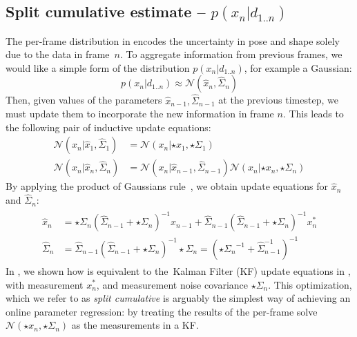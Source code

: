 \subsection{Split cumulative estimate -- $p(x_n|d_{1..n})$}
\label{sec:split}
The per-frame distribution in  encodes the uncertainty in pose and shape solely due to the data in frame~$n$.  To aggregate information from previous frames, we would like a simple form of the distribution $p(x_n|d_{1..n}) $, for example a Gaussian:
\begin{equation}
p(x_n|d_{1..n}) \approx \mathcal{N}(\hat{x}_n, \hat{\Sigma}_n)
\end{equation}
Then, given values of the parameters $\hat{x}_{n-1}, \hat{\Sigma}_{n-1}$ at the previous timestep, we must update them to incorporate the new information in frame $n$.   
%
This leads to the following pair of inductive update equations:
\begin{align}
\mathcal{N}(x_n|\hat{x}_1, \hat{\Sigma}_1) &= \mathcal{N}(x_n|\star{x}_1, \star{\Sigma}_1) \\
\mathcal{N}(x_n | \hat{x}_n, \hat{\Sigma}_n) &= \mathcal{N}(x_n | \hat{x}_{n-1}, \hat{\Sigma}_{n-1}) \mathcal{N}(x_n |\star{x}_n, \star{\Sigma}_n)
\end{align}
By applying the product of Gaussians rule~\cite{petersen2008matrix}, we obtain update equations for $\hat{x}_n$ and $\hat{\Sigma}_n$:
% 
\begin{align}
\begin{split}
\hat{x}_{n} &= \star\Sigma_{n} (\hat{\Sigma}_{n-1} + \star\Sigma_{n})^{-1} \hat{x}_{n-1} + 
\hat{\Sigma}_{n-1} (\hat{\Sigma}_{n-1} + \star\Sigma_n)^{-1} x_n^*
\\
\hat{\Sigma}_n &= \hat{\Sigma}_{n-1} (\hat{\Sigma}_{n-1} + {\star\Sigma_n})^{-1} \star\Sigma_n = \left({\star{\Sigma}_n}^{-1} + \hat{\Sigma}_{n-1}^{-1}\right)^{-1}
\label{eq:combining}
\end{split}
\end{align}
% 
In , we shown how  is equivalent to the~Kalman Filter (KF) update equations in , with measurement $x_n^*$, and measurement noise covariance $\star\Sigma_n$. 
%
This optimization, which we refer to as \emph{split cumulative} is arguably the simplest way of achieving an online parameter regression: by treating the results of the per-frame solve $\mathcal{N}(\star{x}_n, \star{\Sigma}_n)$ as the measurements in a KF.

